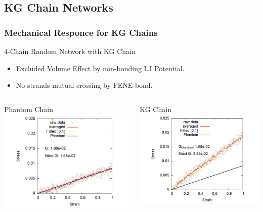 \documentclass[12pt, dvipdfmx]{beamer}
\begin{document}
\subsection{KG Chain Networks}
\begin{frame}
	\frametitle{Mechanical Responce for KG Chains}
	\vspace{-3mm}
	\begin{alertblock}{4-Chain Random Network with KG Chain}
		\begin{itemize}
			\item Excluded Volume Effect by non-bonding LJ Potential.
			\item No strands mutual crossing by FENE bond.
		\end{itemize}
	\end{alertblock}
	\vspace{-4mm}
	\begin{columns}[T, onlytextwidth]
			\begin{block}{Phantom Chain}
				\includegraphics[width=\textwidth]{4chain_N50_PNM_shear.png}
			\end{block}
			
			\begin{block}{KG Chain}
				\includegraphics[width=\textwidth]{4chain_N50_shear.png}
			\end{block}
	\end{columns}


\end{frame}
\end{document}

